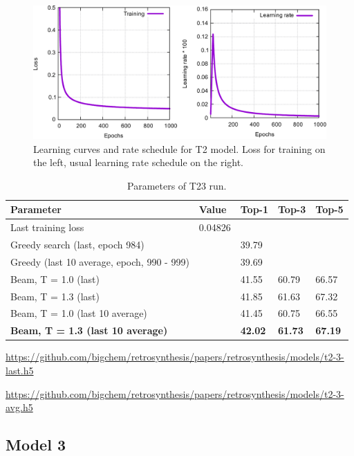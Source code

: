 \documentclass{article}
\begin{document}
\begin{figure}[h!]
  \centering
  \includegraphics[width = 16.5cm]{images/t2-3.pdf}
  \caption{Learning curves and rate schedule for T2 model. Loss for training on the left, usual learning rate schedule on the right.}
  \label{fig:t21}
\end{figure}

\begin{table}[h!]
\caption{Parameters of T23 run.}
  \centering
  \begin{tabular}{p{8.2cm}p{1.5cm}p{1.5cm}p{1.5cm}p{1.5cm}}
    \toprule
    Parameter & Value & Top-1 & Top-3 & Top-5 \\
    \midrule
    Last training loss & 0.04826 & & & \\
    \midrule
    Greedy search (last, epoch 984) & & 39.79 & & \\
    Greedy (last 10 average, epoch, 990 -  999) & & 39.69 & & \\
    \midrule
    Beam, T = 1.0 (last) & & 41.55 & 60.79 & 66.57  \\
    Beam, T = 1.3 (last) & & 41.85 & 61.63  & 67.32 \\ 
    \midrule
    Beam, T = 1.0 (last 10 average) & & 41.45  & 60.75 &  66.55\\
    \textbf{Beam, T = 1.3 (last 10 average)} & & \textbf{42.02}  & \textbf{61.73}  & \textbf{67.19} \\ 
    \bottomrule
  \end{tabular}
  \label{tbl:t23}

\end{table} 

\url{https://github.com/bigchem/retrosynthesis/papers/retrosynthesis/models/t2-3-last.h5}

\url{https://github.com/bigchem/retrosynthesis/papers/retrosynthesis/models/t2-3-avg.h5}
 
 \newpage

 \subsection{Model 3}
 
\end{document}

